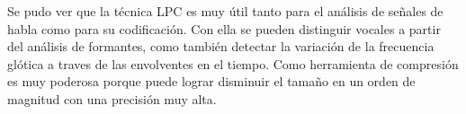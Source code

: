 
	Se pudo ver que la técnica LPC es muy útil tanto para el análisis de señales de habla como para su codificación. Con ella se pueden distinguir vocales a partir del análisis de formantes, como también detectar la variación de la frecuencia glótica a traves de las envolventes en el tiempo. Como herramienta de compresión es muy poderosa porque puede lograr disminuir el tamaño en un orden de magnitud con una precisión muy alta.

